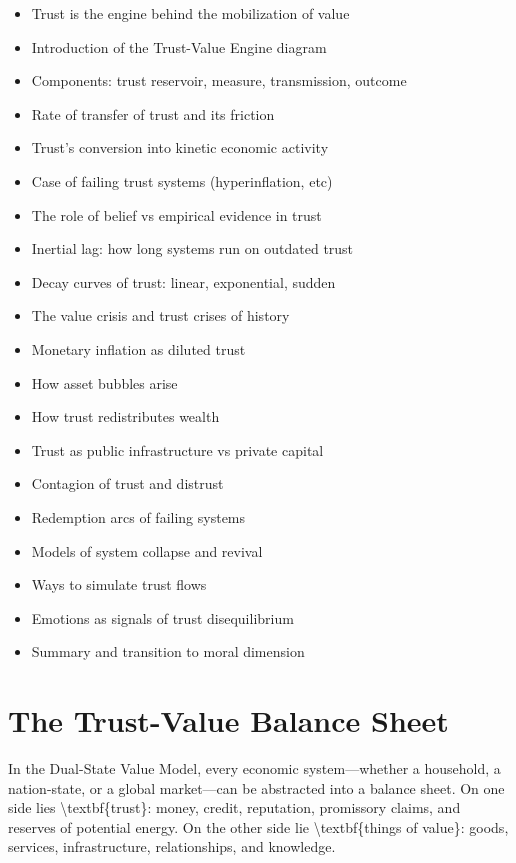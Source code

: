 \documentclass[11pt,oneside]{book}
\begin{document}
\begin{itemize}
\item Trust is the engine behind the mobilization of value
\item Introduction of the Trust-Value Engine diagram
\item Components: trust reservoir, measure, transmission, outcome
\item Rate of transfer of trust and its friction
\item Trust's conversion into kinetic economic activity
\item Case of failing trust systems (hyperinflation, etc)
\item The role of belief vs empirical evidence in trust
\item Inertial lag: how long systems run on outdated trust
\item Decay curves of trust: linear, exponential, sudden
\item The value crisis and trust crises of history
\item Monetary inflation as diluted trust
\item How asset bubbles arise
\item How trust redistributes wealth
\item Trust as public infrastructure vs private capital
\item Contagion of trust and distrust
\item Redemption arcs of failing systems
\item Models of system collapse and revival
\item Ways to simulate trust flows
\item Emotions as signals of trust disequilibrium
\item Summary and transition to moral dimension
\end{itemize}

\section{The Trust-Value Balance Sheet}

In the Dual-State Value Model, every economic system—whether a household, a nation-state, or a global market—can be abstracted into a balance sheet. On one side lies \textbackslash textbf\{trust\}: money, credit, reputation, promissory claims, and reserves of potential energy. On the other side lie \textbackslash textbf\{things of value\}: goods, services, infrastructure, relationships, and knowledge.
\end{document}
